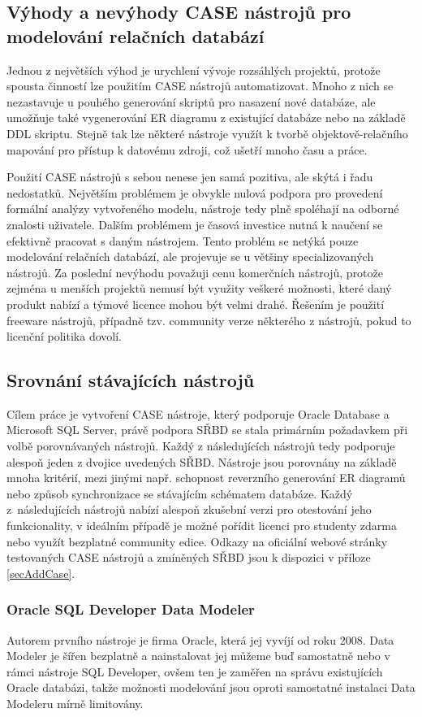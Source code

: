 \documentclass[czech,bachelor,public,dept460,male,oneside]{diploma}
\begin{document}
	\subsection{Výhody a nevýhody CASE nástrojů pro modelování relačních databází}
	Jednou z největších výhod je urychlení vývoje rozsáhlých projektů, protože spousta činností lze použitím CASE nástrojů automatizovat. Mnoho z nich se nezastavuje u pouhého generování skriptů pro nasazení nové databáze, ale umožňuje také vygenerování ER diagramu z existující databáze nebo na základě DDL skriptu. Stejně tak lze některé nástroje využít k tvorbě objektově-relačního mapování pro přístup k datovému zdroji, což ušetří mnoho času a práce. 
	
	Použití CASE nástrojů s sebou nenese jen samá pozitiva, ale skýtá i řadu nedostatků. Největším problémem je obvykle nulová podpora pro provedení formální analýzy vytvořeného modelu, nástroje tedy plně spoléhají na odborné znalosti uživatele. Dalším problémem je časová investice nutná k naučení se efektivně pracovat s daným nástrojem. Tento problém se netýká pouze modelování relačních databází, ale projevuje se u většiny specializovaných nástrojů.	Za poslední nevýhodu považuji cenu komerčních nástrojů, protože zejména u menších projektů nemusí být využity veškeré možnosti, které daný produkt nabízí a týmové licence mohou být velmi drahé. Řešením je použití freeware nástrojů, případně tzv. community verze některého z nástrojů, pokud to licenční politika dovolí.
	
	\subsection{Srovnání stávajících nástrojů}
	Cílem práce je vytvoření CASE nástroje, který podporuje Oracle Database a Microsoft SQL Server, právě podpora SŘBD se stala primárním požadavkem při volbě porovnávaných nástrojů. Každý z následujících nástrojů tedy podporuje alespoň jeden z dvojice uvedených SŘBD. Nástroje jsou porovnány na základě mnoha kritérií, mezi jinými např. schopnost reverzního generování ER diagramů nebo způsob synchronizace se stávajícím schématem databáze. Každý z~následujících nástrojů nabízí alespoň zkušební verzi pro otestování jeho funkcionality, v ideálním případě je možné pořídit licenci pro studenty zdarma nebo využít bezplatné community edice. Odkazy na oficiální webové stránky testovaných CASE nástrojů a zmíněných SŘBD jsou k dispozici v příloze \ref{secAddCase}. 
	
		\subsubsection{Oracle SQL Developer Data Modeler}
		Autorem prvního nástroje je firma Oracle, která jej vyvíjí od roku 2008. Data Modeler je šířen bezplatně a nainstalovat jej můžeme buď samostatně nebo v rámci nástroje SQL Developer, ovšem ten je zaměřen na správu existujících Oracle databázi, takže možnosti modelování jsou oproti samostatné instalaci Data Modeleru mírně limitovány.
		
\end{document}

